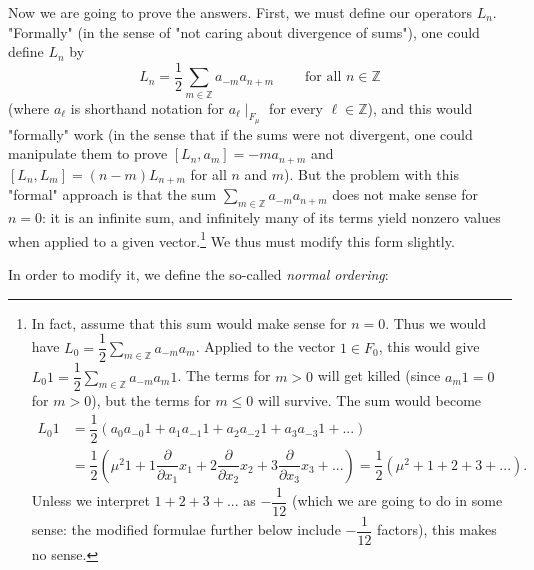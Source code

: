 \documentclass
[numbers=enddot,12pt,final,onecolumn,german,notitlepage]{scrartcl}%
\theoremstyle{definition}
\begin{document}
Now we are going to prove the answers. First, we must define our operators
$L_{n}$. "Formally" (in the sense of "not caring about divergence of sums"),
one could define $L_{n}$ by
\begin{equation}
L_{n}=\dfrac{1}{2}\sum\limits_{m\in\mathbb{Z}}a_{-m}a_{n+m}%
\ \ \ \ \ \ \ \ \ \ \text{for all }n\in\mathbb{Z} \label{def.fockvir.wrong}%
\end{equation}
(where $a_{\ell}$ is shorthand notation for $a_{\ell}\mid_{F_{\mu}}$ for every
$\ell\in\mathbb{Z}$), and this would "formally" work (in the sense that if the
sums were not divergent, one could manipulate them to prove $\left[
L_{n},a_{m}\right]  =-ma_{n+m}$ and $\left[  L_{n},L_{m}\right]  =\left(
n-m\right)  L_{n+m}$ for all $n$ and $m$). But the problem with this "formal"
approach is that the sum $\sum\limits_{m\in\mathbb{Z}}a_{-m}a_{n+m}$ does not
make sense for $n=0$: it is an infinite sum, and infinitely many of its terms
yield nonzero values when applied to a given vector.\footnote{In fact, assume
that this sum would make sense for $n=0$. Thus we would have $L_{0}=\dfrac
{1}{2}\sum\limits_{m\in\mathbb{Z}}a_{-m}a_{m}$. Applied to the vector $1\in
F_{0}$, this would give $L_{0}1=\dfrac{1}{2}\sum\limits_{m\in\mathbb{Z}}%
a_{-m}a_{m}1$. The terms for $m>0$ will get killed (since $a_{m}1=0$ for
$m>0$), but the terms for $m\leq0$ will survive. The sum would become
\begin{align*}
L_{0}1  &  =\dfrac{1}{2}\left(  a_{0}a_{-0}1+a_{1}a_{-1}1+a_{2}a_{-2}%
1+a_{3}a_{-3}1+...\right) \\
&  =\dfrac{1}{2}\left(  \mu^{2}1+1\dfrac{\partial}{\partial x_{1}}%
x_{1}+2\dfrac{\partial}{\partial x_{2}}x_{2}+3\dfrac{\partial}{\partial x_{3}%
}x_{3}+...\right)  =\dfrac{1}{2}\left(  \mu^{2}+1+2+3+...\right)  .
\end{align*}
Unless we interpret $1+2+3+...$ as $-\dfrac{1}{12}$ (which we are going to do
in some sense: the modified formulae further below include $-\dfrac{1}{12}$
factors), this makes no sense.} We thus must modify this form slightly.

In order to modify it, we define the so-called \textit{normal ordering}:
\end{document}
